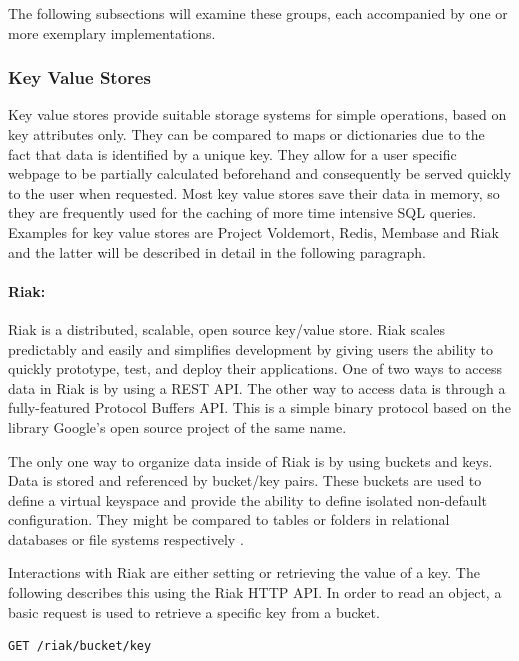 The following subsections will examine these groups, each accompanied by one or more exemplary implementations.      

\subsubsection{Key Value Stores}

Key value stores provide suitable storage systems for simple operations, based on key attributes only. They can be compared to maps or dictionaries due to the fact that data is identified by a unique key. They allow for a user specific webpage to be partially calculated beforehand and consequently be served quickly to the user when requested. Most key value stores save their data in memory, so they are frequently used for the caching of more time intensive \ac{SQL} queries. Examples for key value stores are Project Voldemort, Redis, Membase and Riak and the latter will be described in detail in the following paragraph.

\paragraph{Riak:} Riak is a distributed, scalable, open source key/value store. Riak scales predictably and easily and simplifies development by giving users the ability to quickly prototype, test, and deploy their applications. One of two ways to access data in Riak is by using a \ac{REST} \ac{API}. The other way to access data is through a fully-featured Protocol Buffers \ac{API}. This is a simple binary protocol based on the library Google's open source project of the same name.

The only one way to organize data inside of Riak is by using buckets and keys. Data is stored and referenced by bucket/key pairs. These buckets are used to define a virtual keyspace and provide the ability to define isolated non-default configuration. They might be compared to tables or folders in relational databases or file systems respectively \cite{Riak:Buckets}.

Interactions with Riak are either setting or retrieving the value of a key. The following describes this using the Riak \ac{HTTP} \ac{API}. In order to read an object, a basic request is used to retrieve a specific key from a bucket. 

\begin{code}
\begin{verbatim}
GET /riak/bucket/key
\end{verbatim}
\label{lst:riak_get}
\end{code}

